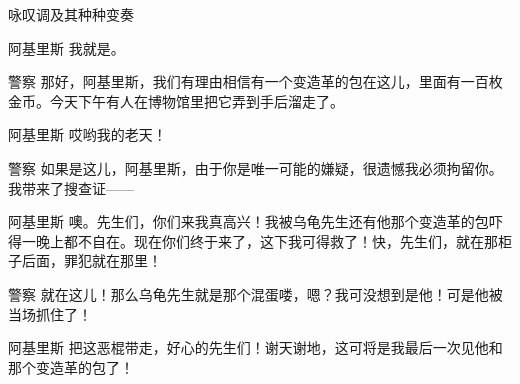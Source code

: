 \begin{dialog}{咏叹调及其种种变奏}
\begin{dialogue}
\item[阿基里斯]我就是。

\item[警察]那好，阿基里斯，我们有理由相信有一个变造革的包在这儿，里面有一百枚金币。今天下午有人在博物馆里把它弄到手后溜走了。

\item[阿基里斯]哎哟我的老天！

\item[警察]如果是这儿，阿基里斯，由于你是唯一可能的嫌疑，很遗憾我必须拘留你。我带来了搜查证——

\item[阿基里斯]噢。先生们，你们来我真高兴！我被乌龟先生还有他那个变造革的包吓得一晚上都不自在。现在你们终于来了，这下我可得救了！快，先生们，就在那柜子后面，罪犯就在那里！

\item[警察]就在这儿！那么乌龟先生就是那个混蛋喽，嗯？我可没想到是他！可是他被当场抓住了！

\item[阿基里斯]把这恶棍带走，好心的先生们！谢天谢地，这可将是我最后一次见他和那个变造革的包了！

\end{dialogue}

\end{dialog}

